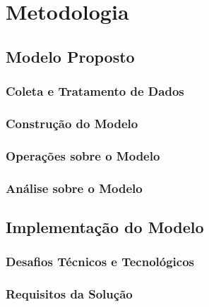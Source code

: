 
%

\chapter{Metodologia}
\label{chap:Methodoly}

\section{Modelo Proposto}
\label{sec:PropusedModel}

\subsection{Coleta e Tratamento de Dados}
\label{subsec:DataAquisition}

\subsection{Construção do Modelo}
\label{subsec:ModelConstruction}

\subsection{Operações sobre o Modelo}
\label{subsec:ModelOperations}

\subsection{Análise sobre o Modelo}
\label{subsec:ModelAnalysis}

\section{Implementação do Modelo}
\label{ModelImplementation}

\subsection{Desafios Técnicos e Tecnológicos}
\label{TechnicalChallenges}

\subsection{Requisitos da Solução}
\label{Requirements}
